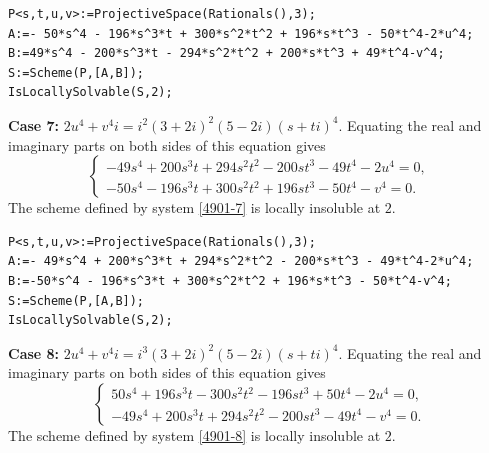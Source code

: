 \documentclass[a4paper,12pt,english,reqno]{amsart}
\begin{document}
\begin{lstlisting}
P<s,t,u,v>:=ProjectiveSpace(Rationals(),3);
A:=- 50*s^4 - 196*s^3*t + 300*s^2*t^2 + 196*s*t^3 - 50*t^4-2*u^4;
B:=49*s^4 - 200*s^3*t - 294*s^2*t^2 + 200*s*t^3 + 49*t^4-v^4;
S:=Scheme(P,[A,B]);
IsLocallySolvable(S,2);
\end{lstlisting}


{\bf Case 7:} $2u^4+v^4i=i^2(3+ 2i)^2(5-2i)(s+ti)^4$.  Equating the real and imaginary parts on both sides of this equation gives
\begin{equation}\label{4901-7}
\begin{cases}
-49s^4 + 200s^3t + 294s^2t^2 - 200st^3 - 49t^4 - 2u^4=0,\\
-50s^4 - 196s^3t + 300s^2t^2 + 196st^3 - 50t^4 - v^4=0.
\end{cases}
\end{equation}
The scheme defined by system \eqref{4901-7} is locally insoluble at $2$.

\begin{lstlisting}
P<s,t,u,v>:=ProjectiveSpace(Rationals(),3);
A:=- 49*s^4 + 200*s^3*t + 294*s^2*t^2 - 200*s*t^3 - 49*t^4-2*u^4;
B:=-50*s^4 - 196*s^3*t + 300*s^2*t^2 + 196*s*t^3 - 50*t^4-v^4;
S:=Scheme(P,[A,B]);
IsLocallySolvable(S,2);
\end{lstlisting}

{\bf Case 8:} $2u^4+v^4i=i^3(3+ 2i)^2(5-2i)(s+ti)^4$.  Equating the real and imaginary parts on both sides of this equation gives
\begin{equation}\label{4901-8}
\begin{cases}
50s^4 + 196s^3t - 300s^2t^2 - 196st^3 + 50t^4 - 2u^4=0,\\
-49s^4 + 200s^3t + 294s^2t^2 - 200st^3 - 49t^4 - v^4=0.
\end{cases}
\end{equation}
The scheme defined by system \eqref{4901-8} is locally insoluble at $2$.
\end{document}
